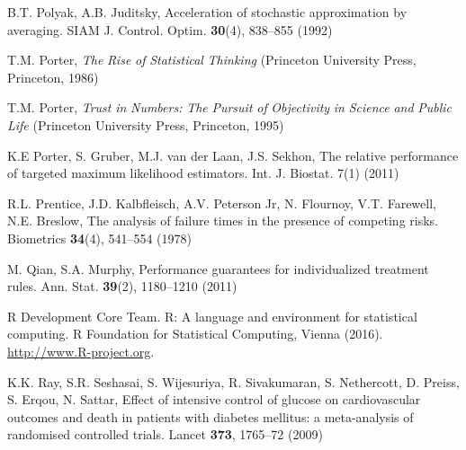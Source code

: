 \begin{list}{}{\setlength{\leftmargin}{2.1em}\setlength{\labelwidth}{0pt}
  \setlength{\labelsep}{0pt}\setlength{\itemindent}{-2.1em}
  \setlength{\parsep}{0pt}\setlength{\itemsep}{2pt}\setlength{\topsep}{0pt}}
\item\label{refentry:REF287}B.T. Polyak, A.B. Juditsky, Acceleration of stochastic approximation by averaging. SIAM J. Control. Optim. \textbf{30}(4), 838--855 (1992)\label{refend:REF287}
\item\label{refentry:REF288}T.M. Porter, \textit{The} \textit{Rise} \textit{of} \textit{Statistical} \textit{Thinking} (Princeton University Press, Princeton, 1986)\label{refend:REF288}
\item\label{refentry:REF289}T.M. Porter, \textit{Trust} \textit{in} \textit{Numbers:} \textit{The} \textit{Pursuit} \textit{of} \textit{Objectivity} \textit{in} \textit{Science} \textit{and} \textit{Public} \textit{Life} (Princeton University Press, Princeton, 1995)\label{refend:REF289}
\item\label{refentry:REF290}K.E Porter, S. Gruber, M.J. van der Laan, J.S. Sekhon, The relative performance of targeted maximum likelihood estimators. Int. J. Biostat. 7(1) (2011)\label{refend:REF290}
\item\label{refentry:REF291}R.L. Prentice, J.D. Kalbfleisch, A.V. Peterson Jr, N. Flournoy, V.T. Farewell, N.E. Breslow, The analysis of failure times in the presence of competing risks. Biometrics \textbf{34}(4), 541--554 (1978)\label{refend:REF291}
\item\label{refentry:REF292}M. Qian, S.A. Murphy, Performance guarantees for individualized treatment rules. Ann. Stat. \textbf{39}(2), 1180--1210 (2011)\label{refend:REF292}
\item\label{refentry:REF293}R Development Core Team. R: A language and environment for statistical computing. R Foundation for Statistical Computing, Vienna (2016). \url{http://www.R-project.org}.\label{refend:REF293}
\item\label{refentry:REF294}K.K. Ray, S.R. Seshasai, S. Wijesuriya, R. Sivakumaran, S. Nethercott, D. Preiss, S. Erqou, N. Sattar, Effect of intensive control of glucose on cardiovascular outcomes and death in patients with diabetes mellitus: a meta-analysis of randomised controlled trials. Lancet \textbf{373}, 1765--72 (2009)\label{refend:REF294}

\end{list}
